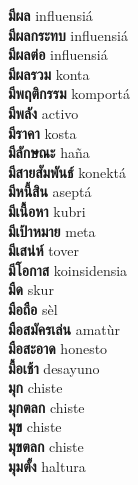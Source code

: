 \textbf{ มีผล  } influensiá \\
\textbf{ มีผลกระทบ  } influensiá \\
\textbf{ มีผลต่อ  } influensiá \\
\textbf{ มีผลรวม  } konta \\
\textbf{ มีพฤติกรรม  } komportá \\
\textbf{ มีพลัง  } activo \\
\textbf{ มีราคา  } kosta \\
\textbf{ มีลักษณะ  } haña \\
\textbf{ มีสายสัมพันธ์  } konektá \\
\textbf{ มีหนี้สิน  } aseptá \\
\textbf{ มีเนื้อหา  } kubri \\
\textbf{ มีเป้าหมาย  } meta \\
\textbf{ มีเสน่ห์  } tover \\
\textbf{ มีโอกาส  } koinsidensia \\
\textbf{ มืด  } skur \\
\textbf{ มือถือ  } sèl \\
\textbf{ มือสมัครเล่น  } amatùr \\
\textbf{ มือสะอาด  } honesto \\
\textbf{ มื้อเช้า  } desayuno \\
\textbf{ มุก  } chiste \\
\textbf{ มุกตลก  } chiste \\
\textbf{ มุข  } chiste \\
\textbf{ มุขตลก  } chiste \\
\textbf{ มุมตั้ง  } haltura \\
